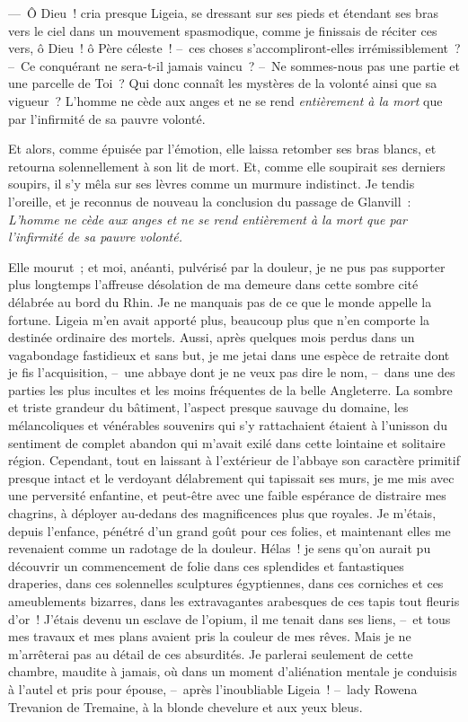 \documentclass[french,twoside]{book} %
\begin{document}
\noindent — Ô Dieu ! cria presque Ligeia, se dressant sur ses pieds et étendant ses bras vers le ciel dans un mouvement spasmodique, comme je finissais de réciter ces vers, ô Dieu ! ô Père céleste ! – ces choses s’accompliront-elles irrémissiblement ? – Ce conquérant ne sera-t-il jamais vaincu ? – Ne sommes-nous pas une partie et une parcelle de Toi ? Qui donc connaît les mystères de la volonté ainsi que sa vigueur ? L’homme ne cède aux anges et ne se rend \emph{entièrement à la mort} que par l’infirmité de sa pauvre volonté.\par
Et alors, comme épuisée par l’émotion, elle laissa retomber ses bras blancs, et retourna solennellement à son lit de mort. Et, comme elle soupirait ses derniers soupirs, il s’y mêla sur ses lèvres comme un murmure indistinct. Je tendis l’oreille, et je reconnus de nouveau la conclusion du passage de Glanvill : \emph{L’homme ne cède aux anges et ne se rend entièrement à la mort que par l’infirmité de sa pauvre volonté.}\par
Elle mourut ; et moi, anéanti, pulvérisé par la douleur, je ne pus pas supporter plus longtemps l’affreuse désolation de ma demeure dans cette sombre cité délabrée au bord du Rhin. Je ne manquais pas de ce que le monde appelle la fortune. Ligeia m’en avait apporté plus, beaucoup plus que n’en comporte la destinée ordinaire des mortels. Aussi, après quelques mois perdus dans un vagabondage fastidieux et sans but, je me jetai dans une espèce de retraite dont je fis l’acquisition, – une abbaye dont je ne veux pas dire le nom, – dans une des parties les plus incultes et les moins fréquentes de la belle Angleterre. La sombre et triste grandeur du bâtiment, l’aspect presque sauvage du domaine, les mélancoliques et vénérables souvenirs qui s’y rattachaient étaient à l’unisson du sentiment de complet abandon qui m’avait exilé dans cette lointaine et solitaire région. Cependant, tout en laissant à l’extérieur de l’abbaye son caractère primitif presque intact et le verdoyant délabrement qui tapissait ses murs, je me mis avec une perversité enfantine, et peut-être avec une faible espérance de distraire mes chagrins, à déployer au-dedans des magnificences plus que royales. Je m’étais, depuis l’enfance, pénétré d’un grand goût pour ces folies, et maintenant elles me revenaient comme un radotage de la douleur. Hélas ! je sens qu’on aurait pu découvrir un commencement de folie dans ces splendides et fantastiques draperies, dans ces solennelles sculptures égyptiennes, dans ces corniches et ces ameublements bizarres, dans les extravagantes arabesques de ces tapis tout fleuris d’or ! J’étais devenu un esclave de l’opium, il me tenait dans ses liens, – et tous mes travaux et mes plans avaient pris la couleur de mes rêves. Mais je ne m’arrêterai pas au détail de ces absurdités. Je parlerai seulement de cette chambre, maudite à jamais, où dans un moment d’aliénation mentale je conduisis à l’autel et pris pour épouse, – après l’inoubliable Ligeia ! – lady Rowena Trevanion de Tremaine, à la blonde chevelure et aux yeux bleus.\par
\end{document}
